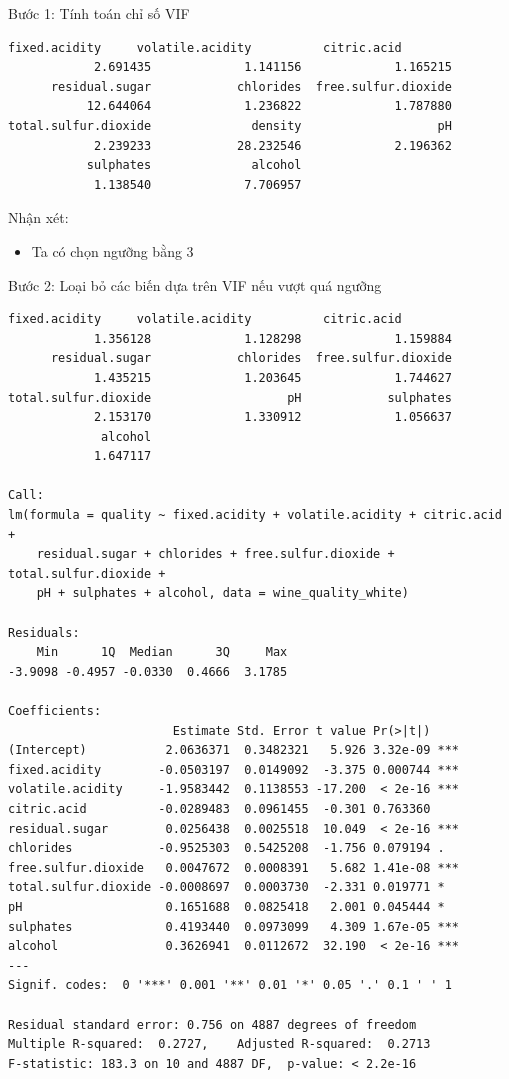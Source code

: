 Bước 1: Tính toán chỉ số VIF
\begin{lstlisting}
fixed.acidity     volatile.acidity          citric.acid 
            2.691435             1.141156             1.165215 
      residual.sugar            chlorides  free.sulfur.dioxide 
           12.644064             1.236822             1.787880 
total.sulfur.dioxide              density                   pH 
            2.239233            28.232546             2.196362 
           sulphates              alcohol 
            1.138540             7.706957 
\end{lstlisting}
Nhận xét:
\begin{itemize}
    \item Ta có chọn ngưỡng bằng 3
\end{itemize}
Bước 2: Loại bỏ các biến dựa trên VIF nếu vượt quá ngưỡng
\begin{lstlisting}
fixed.acidity     volatile.acidity          citric.acid 
            1.356128             1.128298             1.159884 
      residual.sugar            chlorides  free.sulfur.dioxide 
            1.435215             1.203645             1.744627 
total.sulfur.dioxide                   pH            sulphates 
            2.153170             1.330912             1.056637 
             alcohol 
            1.647117 

Call:
lm(formula = quality ~ fixed.acidity + volatile.acidity + citric.acid + 
    residual.sugar + chlorides + free.sulfur.dioxide + total.sulfur.dioxide + 
    pH + sulphates + alcohol, data = wine_quality_white)

Residuals:
    Min      1Q  Median      3Q     Max 
-3.9098 -0.4957 -0.0330  0.4666  3.1785 

Coefficients:
                       Estimate Std. Error t value Pr(>|t|)    
(Intercept)           2.0636371  0.3482321   5.926 3.32e-09 ***
fixed.acidity        -0.0503197  0.0149092  -3.375 0.000744 ***
volatile.acidity     -1.9583442  0.1138553 -17.200  < 2e-16 ***
citric.acid          -0.0289483  0.0961455  -0.301 0.763360    
residual.sugar        0.0256438  0.0025518  10.049  < 2e-16 ***
chlorides            -0.9525303  0.5425208  -1.756 0.079194 .  
free.sulfur.dioxide   0.0047672  0.0008391   5.682 1.41e-08 ***
total.sulfur.dioxide -0.0008697  0.0003730  -2.331 0.019771 *  
pH                    0.1651688  0.0825418   2.001 0.045444 *  
sulphates             0.4193440  0.0973099   4.309 1.67e-05 ***
alcohol               0.3626941  0.0112672  32.190  < 2e-16 ***
---
Signif. codes:  0 '***' 0.001 '**' 0.01 '*' 0.05 '.' 0.1 ' ' 1

Residual standard error: 0.756 on 4887 degrees of freedom
Multiple R-squared:  0.2727,	Adjusted R-squared:  0.2713 
F-statistic: 183.3 on 10 and 4887 DF,  p-value: < 2.2e-16
\end{lstlisting}

